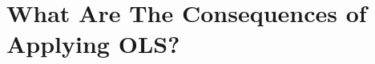 \documentclass[english,12pt]{book}\usepackage[]{graphicx}\usepackage[]{xcolor}
\begin{document}








\section{What Are The Consequences of Applying OLS?}\label{sec:consequences_slm}
\end{document}
